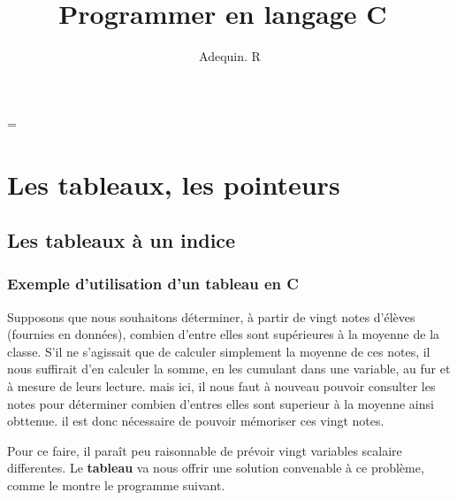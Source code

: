 \documentclass[a4paper]{report}
\author{Adequin. R}
\title{Programmer en langage C~\cite{kr}}
\newcommand\Index[1]{#1\index{#1}}
\renewcommand{\emph}{\textbf}
\begin{document}
\maketitle

\newdimen\oldparindent\oldparindent=\parindent
\tableofcontents




\chapter{Les tableaux, les \Index{pointeurs}~\cite{delannoy}}

	\section{Les tableaux à un indice}
		\subsection{Exemple d'utilisation d'un tableau en C}
			Supposons que nous souhaitons déterminer, à partir de vingt notes d'élèves (fournies en données), combien d'entre elles sont supérieures à la moyenne de la classe. S'il ne s'agissait que de calculer simplement la moyenne de ces notes, il nous suffirait d'en calculer la somme, en les cumulant dans une variable, au fur et à mesure de leurs lecture. mais ici, il nous faut à nouveau pouvoir consulter les notes pour déterminer combien d'entres elles sont superieur à la moyenne ainsi obttenue. il est donc nécessaire de pouvoir mémoriser ces vingt notes.\par
			Pour ce faire, il paraît peu raisonnable de prévoir vingt variables scalaire differentes.
			Le \emph{\Index{tableau}} va nous offrir une solution convenable à ce problème, comme le montre le programme suivant.\\
\end{document}
